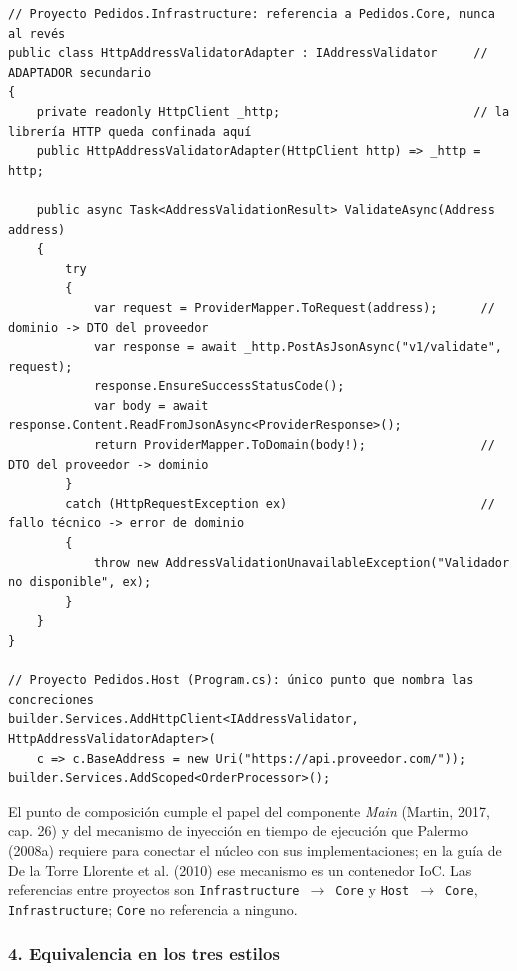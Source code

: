 \documentclass[11pt,a4paper]{article}
\begin{document}
\begin{lstlisting}[language={[Sharp]C}, basicstyle=\ttfamily\scriptsize]
// Proyecto Pedidos.Infrastructure: referencia a Pedidos.Core, nunca al revés
public class HttpAddressValidatorAdapter : IAddressValidator     // ADAPTADOR secundario
{
    private readonly HttpClient _http;                           // la librería HTTP queda confinada aquí
    public HttpAddressValidatorAdapter(HttpClient http) => _http = http;

    public async Task<AddressValidationResult> ValidateAsync(Address address)
    {
        try
        {
            var request = ProviderMapper.ToRequest(address);      // dominio -> DTO del proveedor
            var response = await _http.PostAsJsonAsync("v1/validate", request);
            response.EnsureSuccessStatusCode();
            var body = await response.Content.ReadFromJsonAsync<ProviderResponse>();
            return ProviderMapper.ToDomain(body!);                // DTO del proveedor -> dominio
        }
        catch (HttpRequestException ex)                           // fallo técnico -> error de dominio
        {
            throw new AddressValidationUnavailableException("Validador no disponible", ex);
        }
    }
}

// Proyecto Pedidos.Host (Program.cs): único punto que nombra las concreciones
builder.Services.AddHttpClient<IAddressValidator, HttpAddressValidatorAdapter>(
    c => c.BaseAddress = new Uri("https://api.proveedor.com/"));
builder.Services.AddScoped<OrderProcessor>();
\end{lstlisting}

El punto de composición cumple el papel del componente \emph{Main} (Martin, 2017, cap. 26) y
del mecanismo de inyección en tiempo de ejecución que Palermo (2008a) requiere para conectar el
núcleo con sus implementaciones; en la guía de De la Torre Llorente et al. (2010) ese mecanismo
es un contenedor IoC. Las referencias entre proyectos son
\texttt{Infrastructure}~$\rightarrow$~\texttt{Core} y
\texttt{Host}~$\rightarrow$~\texttt{Core}, \texttt{Infrastructure}; \texttt{Core} no
referencia a ninguno.

\subsubsection*{4. Equivalencia en los tres estilos}
\end{document}

